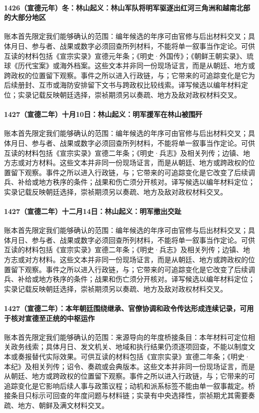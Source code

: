 \paragraph{1426（宣德元年）冬：林山起义：林山军队将明军驱逐出红河三角洲和越南北部的大部分地区} 账本首先限定我们能够确认的范围：编年候选的年序可由官修与后出材料交叉；具体月日、参与者、战果或数字必须回查所列材料，不能将单一叙事当作定论。可供互读的材料包括《宣宗实录》宣德元年条；《明史·外国传》；《朝鲜王朝实录》、琉球《历代宝案》或海外档案。这些文本并非同一份现场证言，而是从朝廷、地方或跨政权的位置留下观察。事件之所以进入行政链，与；它带来的可追踪变化是它为后续册封、互市或海防安排留下文书与跨政权比较线索。译写候选以编年材料定位；实录记载反映朝廷选择，崇祯期须另以奏疏、地方及敌对政权材料交叉。

\paragraph{1427（宣德二年）十月10日：林山起义：明军援军在林山被围歼} 账本首先限定我们能够确认的范围：编年候选的年序可由官修与后出材料交叉；具体月日、参与者、战果或数字必须回查所列材料，不能将单一叙事当作定论。可供互读的材料包括《宣宗实录》宣德二年条；《明史·兵志》及相关列传；边镇、地方志或对方材料。这些文本并非同一份现场证言，而是从朝廷、地方或跨政权的位置留下观察。事件之所以进入行政链，与；它带来的可追踪变化是它改变了后续调兵、补给或地方秩序的条件；战果和伤亡须分开核对。译写候选以编年材料定位；实录记载反映朝廷选择，崇祯期须另以奏疏、地方及敌对政权材料交叉。

\paragraph{1427（宣德二年）十二月14日：林山起义：明军撤出交趾} 账本首先限定我们能够确认的范围：编年候选的年序可由官修与后出材料交叉；具体月日、参与者、战果或数字必须回查所列材料，不能将单一叙事当作定论。可供互读的材料包括《宣宗实录》宣德二年条；《明史·兵志》及相关列传；边镇、地方志或对方材料。这些文本并非同一份现场证言，而是从朝廷、地方或跨政权的位置留下观察。事件之所以进入行政链，与；它带来的可追踪变化是它改变了后续调兵、补给或地方秩序的条件；战果和伤亡须分开核对。译写候选以编年材料定位；实录记载反映朝廷选择，崇祯期须另以奏疏、地方及敌对政权材料交叉。

\paragraph{1427（宣德二年）：本年朝廷围绕继承、官僚协调和政令传达形成连续记录，可用于核对宣德至正统的中枢运作} 账本首先限定我们能够确认的范围：来源导向的年度桥接条目：本年材料可定位相关政务线索；具体月日、发文机关、地域和执行结果仍须逐项回查，不能以制度文本或奏报替代实际效果。可供互读的材料包括《宣宗实录》宣德二年条；《明史·本纪》及相关列传；诏令、奏疏或会典版本。这些文本并非同一份现场证言，而是从朝廷、地方或跨政权的位置留下观察。事件之所以进入行政链，与；它带来的可追踪变化是它影响后续人事与政策议程；动机和派系标签不能由单一叙事裁定。桥接条目只标示可回查的年度问题与材料链；实录有中央选择性，崇祯期尤其需要奏疏、地方、朝鲜及满文材料交叉。

